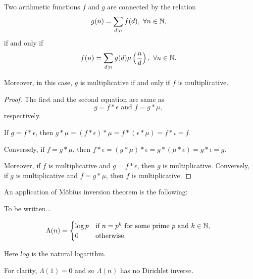 \begin{theorem}
    Two arithmetic functions $f$ and $g$ are connected by the relation \[g(n) = \sum_{d \mid n} f(d), \ \forall n \in \mathbb{N},\] if and only if \[f(n) = \sum_{d \mid n} g(d) \mu\left(\frac{n}{d}\right), \ \forall n \in \mathbb{N}.\]

    Moreover, in this case, $g$ is multiplicative if and only if $f$ is multiplicative.
\end{theorem}
\begin{proof}
The first and the second equation are same as \[g = f \ast \epsilon \text{ and } f = g \ast \mu,\] respectively.

If $g = f \ast \epsilon$, then $g \ast \mu = (f \ast \epsilon) \ast \mu = f \ast (\epsilon \ast \mu) = f \ast \iota = f$.

Conversely, if $f = g \ast \mu$, then $f \ast \epsilon = (g \ast \mu) \ast \epsilon = g \ast (\mu \ast \epsilon) = g \ast \iota = g$.

Moreover, if $f$ is multiplicative and $g = f \ast \epsilon$, then $g$ is multiplicative. Conversely, if $g$ is multiplicative and $f = g \ast \mu$, then $f$ is multiplicative.
\end{proof}

An application of Möbius inversion theorem is the following:
\begin{replacementproof}
    To be written...
\end{replacementproof}

\begin{definition}
    \[\Lambda(n) = \begin{cases}
        \log p & \text{if } n = p^k \text{ for some prime } p \text{ and } k \in \mathbb{N},\\
        0 & \text{otherwise.}\end{cases}\]
    
    Here $log$ is the natural logarithm.
\end{definition}

For clarity, $\Lambda(1) = 0$ and so $\Lambda(n)$ has no Dirichlet inverse.

